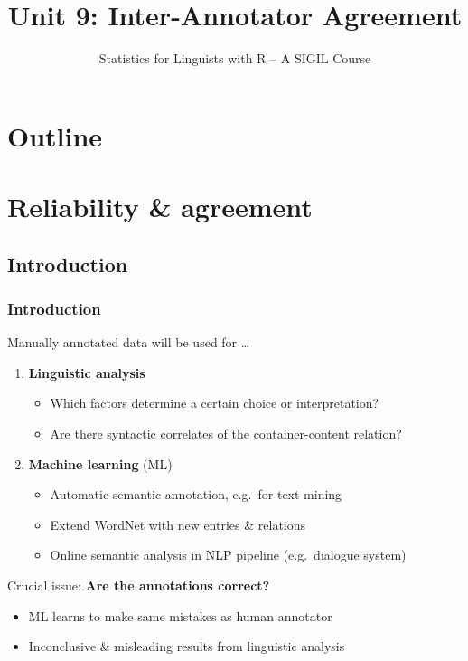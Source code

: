 \documentclass[t]{beamer} %
\title[9.\ Inter-annotator agreement]{Unit 9: Inter-Annotator Agreement}
\subtitle{Statistics for Linguists with R -- A SIGIL Course}
\date[sigil.r-forge.r-project.org]{%
  \light{\tiny \sigilcopyright}}
\begin{document}
\frame{\titlepage}


\section*{Outline}

\section{Reliability \& agreement}

\subsection{Introduction}

\begin{frame}
  \frametitle{Introduction}

  Manually annotated data will be used for \ldots\pause
  \begin{enumerate}
  \item \textbf{Linguistic analysis}
    \begin{itemize}
    \item Which factors determine a certain choice or interpretation?
    \item Are there syntactic correlates of the container-content relation?
    \end{itemize}
    \pause
  \item \textbf{Machine learning} (ML)
    \begin{itemize}
    \item Automatic semantic annotation, e.g.\ for text mining
    \item Extend WordNet with new entries \& relations
    \item Online semantic analysis in NLP pipeline (e.g.\ dialogue system)
    \end{itemize}
    \pause
  \end{enumerate}

  \gap[1]
  Crucial issue: \textbf{Are the annotations correct?}
  \begin{itemize}
  \item[\hand] ML learns to make same mistakes as human annotator
  \item[\hand] Inconclusive \& misleading results from linguistic analysis
  \end{itemize}
\end{frame}
\end{document}
